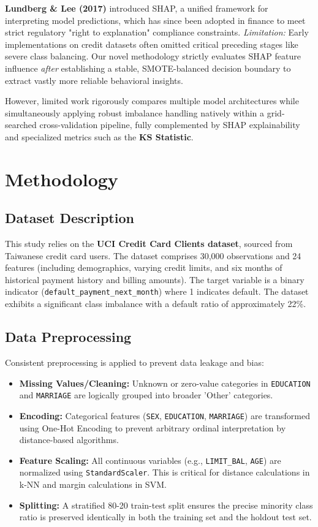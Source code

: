 \documentclass[12pt,a4paper]{article}
\begin{document}
\textbf{Lundberg \& Lee (2017)} introduced SHAP, a unified framework for interpreting model predictions, which has since been adopted in finance to meet strict regulatory "right to explanation" compliance constraints. \textit{Limitation:} Early implementations on credit datasets often omitted critical preceding stages like severe class balancing. Our novel methodology strictly evaluates SHAP feature influence \textit{after} establishing a stable, SMOTE-balanced decision boundary to extract vastly more reliable behavioral insights.

However, limited work rigorously compares multiple model architectures while simultaneously applying robust imbalance handling natively within a grid-searched cross-validation pipeline, fully complemented by SHAP explainability and specialized metrics such as the \textbf{KS Statistic}.

\section{Methodology}

\subsection{Dataset Description}
This study relies on the \textbf{UCI Credit Card Clients dataset}, sourced from Taiwanese credit card users. The dataset comprises 30,000 observations and 24 features (including demographics, varying credit limits, and six months of historical payment history and billing amounts). The target variable is a binary indicator (\texttt{default\_payment\_next\_month}) where 1 indicates default. The dataset exhibits a significant class imbalance with a default ratio of approximately 22\%.

\subsection{Data Preprocessing}
Consistent preprocessing is applied to prevent data leakage and bias:
\begin{itemize}
    \item \textbf{Missing Values/Cleaning:} Unknown or zero-value categories in \texttt{EDUCATION} and \texttt{MARRIAGE} are logically grouped into broader 'Other' categories.
    \item \textbf{Encoding:} Categorical features (\texttt{SEX}, \texttt{EDUCATION}, \texttt{MARRIAGE}) are transformed using One-Hot Encoding to prevent arbitrary ordinal interpretation by distance-based algorithms.
    \item \textbf{Feature Scaling:} All continuous variables (e.g., \texttt{LIMIT\_BAL}, \texttt{AGE}) are normalized using \texttt{StandardScaler}. This is critical for distance calculations in k-NN and margin calculations in SVM.
    \item \textbf{Splitting:} A stratified 80-20 train-test split ensures the precise minority class ratio is preserved identically in both the training set and the holdout test set.
\end{itemize}
\end{document}

